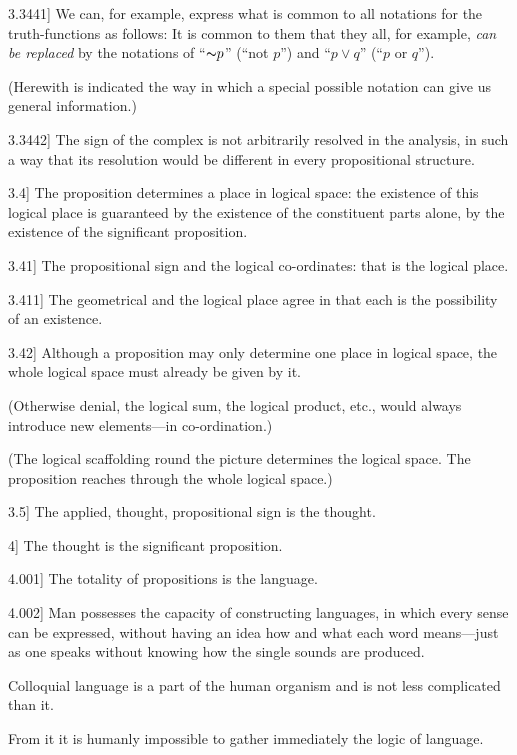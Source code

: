 \documentclass[12pt,oneside]{book}[2007/10/19]
\newcommand{\PropositionE}[2]{%
  \item[\phantomsection\label{PropE:#1}\PropGRef{#1}] #2%
}
\newcommand{\PropGRef}[1]{\hyperref[PropG:#1]{#1}}
\newcommand{\Not}[1]{\mathord{\thicksim} #1}
\begin{document}
\begin{propositions}
\PropositionE{3.3441}
{We can, for example, express what is common to
all notations for the truth-functions as follows: It
is common to them that they all, for example, \emph{can
be replaced} by the notations of ``$\Not{p}$'' (``not $p$'')
and ``$p \lor q$'' (``$p$ or $q$'').

(Herewith is indicated the way in which a special
possible notation can give us general information.)}


\PropositionE{3.3442}
{The sign of the complex is not arbitrarily
resolved in the analysis, in such a way that its
resolution would be different in every propositional
structure.}


\PropositionE{3.4}
{The proposition determines a place in logical
space: the existence of this logical place is guaranteed
by the existence of the constituent parts alone,
by the existence of the significant proposition.}


\PropositionE{3.41}
{The propositional sign and the logical co-ordinates:
that is the logical place.}


\PropositionE{3.411}
{The geometrical and the logical place agree in
that each is the possibility of an existence.}


\PropositionE{3.42}
{Although a proposition may only determine
one place in logical space, the whole logical space
must already be given by it.

(Otherwise denial, the logical sum, the logical
product, etc., would always introduce new elements---in
co-ordination.)

(The logical scaffolding round the picture determines
the logical space. The proposition reaches
through the whole logical space.)}


\PropositionE{3.5}
{The applied, thought, propositional sign is the
thought.}


\PropositionE{4}
{The thought is the significant proposition.}


\PropositionE{4.001}
{The totality of propositions is the language.}


\PropositionE{4.002}
{Man possesses the capacity of constructing
languages, in which every sense can be expressed,
without having an idea how and what each word
means---just as one speaks without knowing how
the single sounds are produced.

Colloquial language is a part of the human
organism and is not less complicated than it.

From it it is humanly impossible to gather
immediately the logic of language.

}
\end{propositions}
\end{document}
